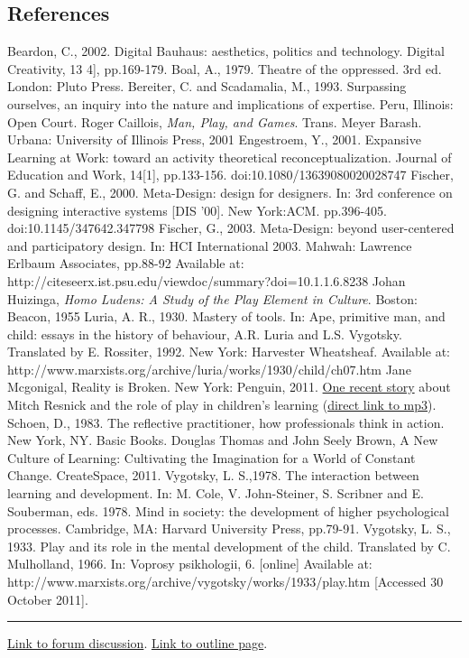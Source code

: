 \subsection{References}

Beardon, C., 2002. Digital Bauhaus: aesthetics, politics and technology.
Digital Creativity, 13 4{]}, pp.169-179. Boal, A., 1979. Theatre of the
oppressed. 3rd ed. London: Pluto Press. Bereiter, C. and Scadamalia, M.,
1993. Surpassing ourselves, an inquiry into the nature and implications
of expertise. Peru, Illinois: Open Court. Roger Caillois, \emph{Man,
Play, and Games}. Trans. Meyer Barash. Urbana: University of Illinois
Press, 2001 Engestroem, Y., 2001. Expansive Learning at Work: toward an
activity theoretical reconceptualization. Journal of Education and Work,
14{[}1{]}, pp.133-156. doi:10.1080/13639080020028747 Fischer, G. and
Schaff, E., 2000. Meta-Design: design for designers. In: 3rd conference
on designing interactive systems {[}DIS '00{]}. New York:ACM.
pp.396-405. doi:10.1145/347642.347798 Fischer, G., 2003. Meta-Design:
beyond user-centered and participatory design. In: HCI International
2003. Mahwah: Lawrence Erlbaum Associates, pp.88-92 Available at:
http://citeseerx.ist.psu.edu/viewdoc/summary?doi=10.1.1.6.8238 Johan
Huizinga, \emph{Homo Ludens: A Study of the Play Element in Culture}.
Boston: Beacon, 1955 Luria, A. R., 1930. Mastery of tools. In: Ape,
primitive man, and child: essays in the history of behaviour, A.R. Luria
and L.S. Vygotsky. Translated by E. Rossiter, 1992. New York: Harvester
Wheatsheaf. Available at:
http://www.marxists.org/archive/luria/works/1930/child/ch07.htm Jane
Mcgonigal, Reality is Broken. New York: Penguin, 2011.
\href{http://www.sffaudio.com/?p=38223}{One recent story} about Mitch
Resnick and the role of play in children's learning
(\href{http://www.legobuildersoftomorrow.com/podcast1.mp3}{direct link
to mp3}). Schoen, D., 1983. The reflective practitioner, how
professionals think in action. New York, NY. Basic Books. Douglas Thomas
and John Seely Brown, A New Culture of Learning: Cultivating the
Imagination for a World of Constant Change. CreateSpace, 2011. Vygotsky,
L. S.,1978. The interaction between learning and development. In: M.
Cole, V. John-Steiner, S. Scribner and E. Souberman, eds. 1978. Mind in
society: the development of higher psychological processes. Cambridge,
MA: Harvard University Press, pp.79-91. Vygotsky, L. S., 1933. Play and
its role in the mental development of the child. Translated by C.
Mulholland, 1966. In: Voprosy psikhologii, 6. {[}online{]} Available at:
http://www.marxists.org/archive/vygotsky/works/1933/play.htm {[}Accessed
30 October 2011{]}.

\begin{center}\rule{3in}{0.4pt}\end{center}

\href{http://socialmediaclassroom.com/host/peeragogy/forum/initial-rough-outline\#comment-1618}{Link
to forum discussion}.
\href{http://socialmediaclassroom.com/host/peeragogy/wiki/initial-outline-source-book}{Link
to outline page}.
